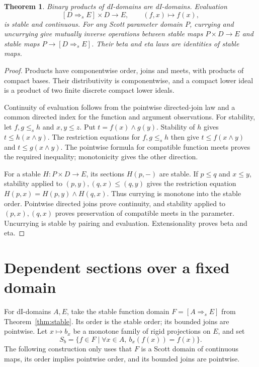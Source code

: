 \documentclass[11pt]{article}
\newtheorem{theorem}{Theorem}[section]
\begin{document}
\begin{theorem}
Binary products of dI-domains are dI-domains. Evaluation
\[
 [D\Rightarrow_s E]\times D\longrightarrow E,\qquad (f,x)\longmapsto f(x),
\]
is stable and continuous. For any Scott parameter domain $P$, currying
and uncurrying give mutually inverse operations between stable maps
$P\times D\to E$ and stable maps $P\to[D\Rightarrow_s E]$.
Their beta and eta laws are identities of stable maps.
\end{theorem}
\begin{proof}
Products have componentwise order, joins and meets, with products of
compact bases. Their distributivity is componentwise, and a compact
lower ideal is a product of two finite discrete compact lower ideals.

Continuity of evaluation follows from the pointwise directed-join law
and a common directed index for the function and argument observations.
For stability, let $f,g\le_s h$ and $x,y\le z$. Put
$t=f(x)\wedge g(y)$. Stability of $h$ gives $t\le h(x\wedge y)$.
The restriction equations for $f,g\le_s h$ then give
$t\le f(x\wedge y)$ and $t\le g(x\wedge y)$. The pointwise formula for
compatible function meets proves the required inequality; monotonicity
gives the other direction.

For a stable $H:P\times D\to E$, its sections $H(p,-)$ are stable.
If $p\le q$ and $x\le y$, stability applied to $(p,y),(q,x)\le(q,y)$
gives the restriction equation
$H(p,x)=H(p,y)\wedge H(q,x)$. Thus currying is monotone into the stable
order. Pointwise directed joins prove continuity, and stability applied
to $(p,x),(q,x)$ proves preservation of compatible meets in the parameter.
Uncurrying is stable by pairing and evaluation. Extensionality proves
beta and eta.
\end{proof}

\section{Dependent sections over a fixed domain}

For dI-domains $A,E$, take the stable function domain
$F=[A\Rightarrow_s E]$ from Theorem~\ref{thm:stable}. Its order is the stable
order; its bounded joins are pointwise. Let $x\mapsto b_x$ be a
monotone family of rigid projections on $E$, and set
\[
 S_b=\{f\in F\mid \forall x\in A,\ b_x(f(x))=f(x)\}.
\]
The following construction only uses that $F$ is a Scott domain of
continuous maps, its order implies pointwise order, and its bounded
joins are pointwise.
\end{document}
